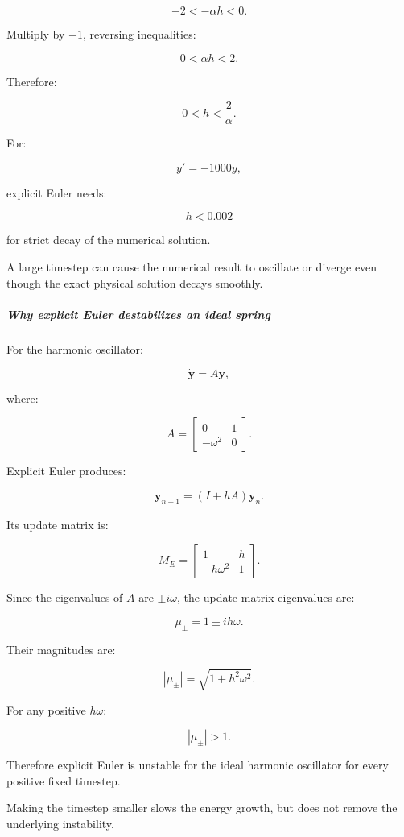 \[
-2<-\alpha h<0.
\]

Multiply by \(-1\), reversing inequalities:

\[
0<\alpha h<2.
\]

Therefore:

\[
\boxed{ 0<h<\frac2\alpha }.
\]

For:

\[
y'=-1000y,
\]

explicit Euler needs:

\[
\boxed{h<0.002}
\]

for strict decay of the numerical solution.

A large timestep can cause the numerical result to oscillate or diverge even though the exact physical solution decays smoothly.

\subparagraph{Why explicit Euler destabilizes an ideal spring}\label{02-foundations-ii-ch025-why-explicit-euler-destabilizes-an-ideal-spring}

For the harmonic oscillator:

\[
\dot{\mathbf y}=A\mathbf y,
\]

where:

\[
A= \begin{bmatrix} 0&1\\ -\omega^2&0 \end{bmatrix}.
\]

Explicit Euler produces:

\[
\mathbf y_{n+1}=(I+hA)\mathbf y_n.
\]

Its update matrix is:

\[
\boxed{ M_E= \begin{bmatrix} 1&h\\ -h\omega^2&1 \end{bmatrix} }.
\]

Since the eigenvalues of \(A\) are \(\pm i\omega\), the update-matrix eigenvalues are:

\[
\mu_\pm=1\pm ih\omega.
\]

Their magnitudes are:

\[
|\mu_\pm| = \sqrt{1+h^2\omega^2}.
\]

For any positive \(h\omega\):

\[
\boxed{|\mu_\pm|>1}.
\]

Therefore explicit Euler is unstable for the ideal harmonic oscillator for every positive fixed timestep.

Making the timestep smaller slows the energy growth, but does not remove the underlying instability.

